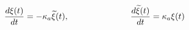 \begin{equation}
\label{fermiondynamics1}
\frac{d\xi(t)}{dt} = -\kappa_a{\widetilde \xi}(t),
\hspace{1.0in}
\frac{d{\widetilde \xi}(t)}{dt} = \kappa_a\xi(t)
\end{equation}

